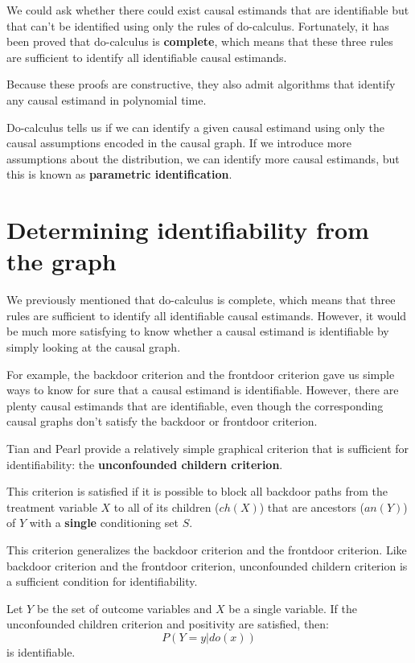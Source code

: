 We could ask whether there could exist causal estimands that are identifiable but that 
can’t be identified using only the rules of do-calculus. Fortunately, it 
has been proved that do-calculus is \textbf{complete}, which means that these three rules are
sufficient to identify all identifiable causal estimands.

Because these proofs are constructive, they also admit algorithms that identify any causal
estimand in polynomial time.

Do-calculus tells us if we can identify a given causal estimand using only the causal 
assumptions encoded in the causal graph. If we introduce more assumptions about the
distribution, we can identify more causal estimands, but this is known as \textbf{parametric identification}.
\section{Determining identifiability from the graph}
We previously mentioned that do-calculus is complete, which means that three rules are
sufficient to identify all identifiable causal estimands. However, it would be much more
satisfying to know whether a causal estimand is identifiable by simply looking at the causal graph.

For example, the backdoor criterion and the frontdoor criterion gave us simple ways to know
for sure that a causal estimand is identifiable. However, there are plenty causal estimands
that are identifiable, even though the corresponding causal graphs don't satisfy the backdoor
or frontdoor criterion.

Tian and Pearl provide a relatively simple graphical criterion that is sufficient for identifiability: the \textbf{unconfounded childern criterion}. 

\begin{definition}
    This criterion is satisfied if it is possible to block all backdoor paths from the
    treatment variable $X$ to all of its children ($ch(X)$) that are ancestors ($an(Y)$) of
    $Y$ with a \textbf{single} conditioning set $S$.
\end{definition}

This criterion generalizes the backdoor criterion and the frontdoor criterion. Like backdoor
criterion and the frontdoor criterion, unconfounded childern criterion is a sufficient
condition for identifiability.

\begin{definition}
    Let $Y$ be the set of outcome variables and $X$ be a single variable. If the unconfounded children criterion and positivity are satisfied, then:
    \begin{equation}
        P(Y = y |do(x))
    \end{equation}
    is identifiable.
\end{definition}

